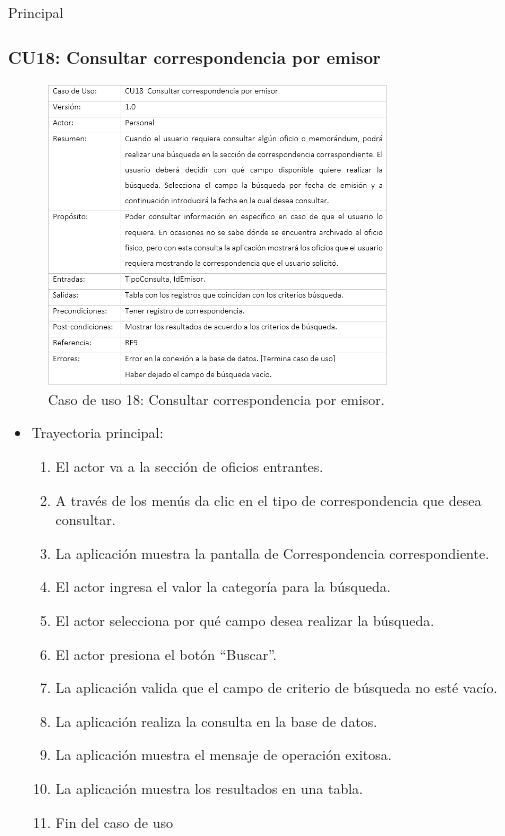 \begin{UCtrayectoria}{Principal}
\subsubsection{CU18: Consultar correspondencia por emisor}
\begin{figure}[htbp!]
		\centering
			\includegraphics[width=0.8\textwidth]{images/CU/CU18}
		\caption{Caso de uso 18: Consultar correspondencia por emisor.}
		\label{Tabla}
	\end{figure}
	
\begin{itemize}
	\item Trayectoria principal:
	\begin{enumerate}
		\item	El actor va a la sección de oficios entrantes.
		\item	A través de los menús da clic en el tipo de correspondencia que desea consultar.
		\item	La aplicación muestra la pantalla  de Correspondencia correspondiente.
		\item	El actor ingresa el valor la categoría para la búsqueda.
		\item	El actor selecciona por qué campo desea realizar la búsqueda.
		\item	El actor presiona el botón “Buscar”.
		\item	La aplicación valida que el campo de criterio de búsqueda no esté vacío.
		\item	La aplicación realiza la consulta en la base de datos.
		\item	La aplicación muestra el mensaje  de operación exitosa.
		\item	La aplicación muestra los resultados en una tabla.
		\item	Fin del caso de uso
	\end{enumerate}
	

\end{itemize}
\end{UCtrayectoria}
